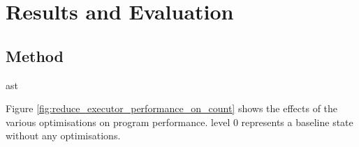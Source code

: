 \chapter{Results and Evaluation} \label{C:results}

\section{Method}
ast



Figure \ref{fig:reduce_executor_performance_on_count} shows the effects of the various optimisations on program performance. level 0 represents a baseline state without any optimisations.

